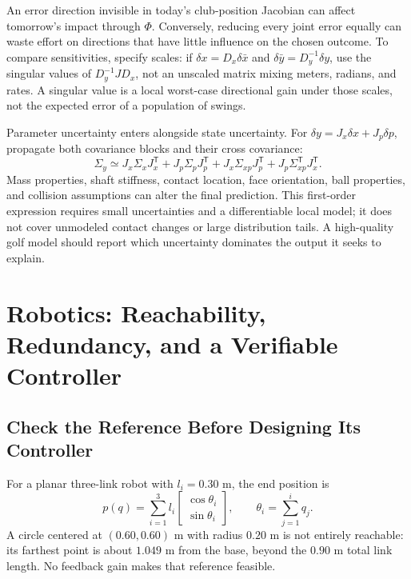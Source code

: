 An error direction invisible in today's club-position Jacobian can affect tomorrow's impact through $\Phi$. Conversely, reducing every joint error equally can waste effort on directions that have little influence on the chosen outcome. To compare sensitivities, specify scales: if $\delta x=D_x\delta\bar x$ and $\delta\bar y=D_y^{-1}\delta y$, use the singular values of $D_y^{-1}J D_x$, not an unscaled matrix mixing meters, radians, and rates. A singular value is a local worst-case directional gain under those scales, not the expected error of a population of swings.

Parameter uncertainty enters alongside state uncertainty. For $\delta y=J_x\delta x+J_p\delta p$, propagate both covariance blocks and their cross covariance:
\begin{equation}
 \Sigma_y\simeq J_x\Sigma_xJ_x^{\mathsf T}+J_p\Sigma_pJ_p^{\mathsf T}
 +J_x\Sigma_{xp}J_p^{\mathsf T}+J_p\Sigma_{xp}^{\mathsf T}J_x^{\mathsf T}.
\end{equation}
Mass properties, shaft stiffness, contact location, face orientation, ball properties, and collision assumptions can alter the final prediction. This first-order expression requires small uncertainties and a differentiable local model; it does not cover unmodeled contact changes or large distribution tails. A high-quality golf model should report which uncertainty dominates the output it seeks to explain.

\section{Robotics: Reachability, Redundancy, and a Verifiable Controller}

\subsection{Check the Reference Before Designing Its Controller}

For a planar three-link robot with $l_i=0.30$ m, the end position is
\begin{equation}
 p(q)=\sum_{i=1}^3 l_i\begin{bmatrix}\cos\theta_i\\\sin\theta_i\end{bmatrix},\qquad
 \theta_i=\sum_{j=1}^i q_j.
\end{equation}
A circle centered at $(0.60,0.60)$ m with radius $0.20$ m is not entirely reachable: its farthest point is about $1.049$ m from the base, beyond the $0.90$ m total link length. No feedback gain makes that reference feasible.

